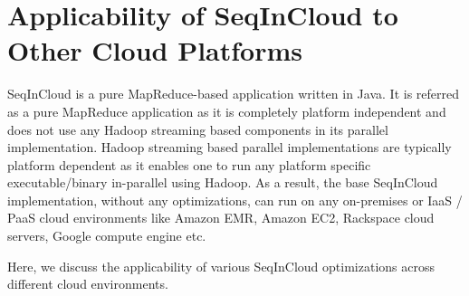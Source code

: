 %
%
%

\section{Applicability of SeqInCloud to Other Cloud Platforms}

SeqInCloud is a pure MapReduce-based application written in Java. It is referred as a pure MapReduce application as it is completely platform independent and does not use any Hadoop streaming based components in its parallel implementation. Hadoop streaming based parallel implementations are typically platform dependent as it enables one to run any platform specific executable/binary in-parallel using Hadoop. As a result, the base SeqInCloud implementation, without any optimizations, can run on any on-premises or IaaS / PaaS cloud environments like Amazon EMR, Amazon EC2, Rackspace cloud servers, Google compute engine etc.

Here, we discuss the applicability of various SeqInCloud optimizations across different cloud environments. 

